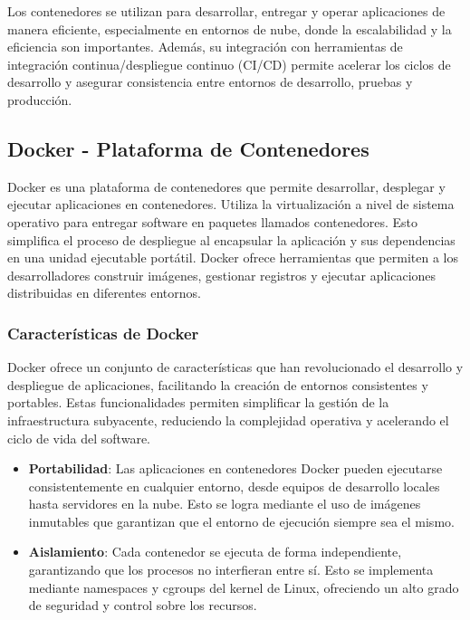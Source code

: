 {        Los contenedores se utilizan para desarrollar, entregar y operar aplicaciones de manera eficiente, especialmente en entornos de nube, donde la escalabilidad y la eficiencia son importantes. Además, su integración con herramientas de integración continua/despliegue continuo (CI/CD) permite acelerar los ciclos de desarrollo y asegurar consistencia entre entornos de desarrollo, pruebas y producción.
        
        \subsection{Docker - Plataforma de Contenedores}
            Docker es una plataforma de contenedores que permite desarrollar, desplegar y ejecutar aplicaciones en contenedores. Utiliza la virtualización a nivel de sistema operativo para entregar software en paquetes llamados contenedores. Esto simplifica el proceso de despliegue al encapsular la aplicación y sus dependencias en una unidad ejecutable portátil. Docker ofrece herramientas que permiten a los desarrolladores construir imágenes, gestionar registros y ejecutar aplicaciones distribuidas en diferentes entornos.
        
            \subsubsection{Características de Docker}
                Docker ofrece un conjunto de características que han revolucionado el desarrollo y despliegue de aplicaciones, facilitando la creación de entornos consistentes y portables. Estas funcionalidades permiten simplificar la gestión de la infraestructura subyacente, reduciendo la complejidad operativa y acelerando el ciclo de vida del software.

                \begin{itemize}
                    \item \textbf{Portabilidad}: Las aplicaciones en contenedores Docker pueden ejecutarse consistentemente en cualquier entorno, desde equipos de desarrollo locales hasta servidores en la nube. Esto se logra mediante el uso de imágenes inmutables que garantizan que el entorno de ejecución siempre sea el mismo.
                    
                    \item \textbf{Aislamiento}: Cada contenedor se ejecuta de forma independiente, garantizando que los procesos no interfieran entre sí. Esto se implementa mediante namespaces y cgroups del kernel de Linux, ofreciendo un alto grado de seguridad y control sobre los recursos.
                \end{itemize}
            
}
